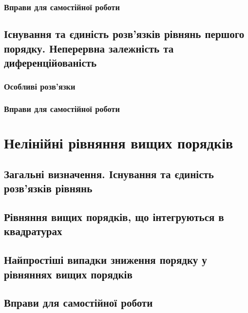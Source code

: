 		\subsubsection{Вправи для самостійної роботи}
		

	\subsection{Існування та єдиність розв'язків рівнянь першого порядку. Неперервна залежність та диференційованість}
	

		\subsubsection{Особливі розв'язки}
		

		\subsubsection{Вправи для самостійної роботи}
		

\section{Нелінійні рівняння вищих порядків}


	\subsection{Загальні визначення. Існування та єдиність роз\-в'я\-з\-ків рівнянь}
	

	\subsection{Рівняння вищих порядків, що інтегруються в \allowbreak квадратурах}
	

	\subsection{Найпростіші випадки зниження порядку у рівняннях вищих порядків}
	

	\subsection{Вправи для самостійної роботи}
	

